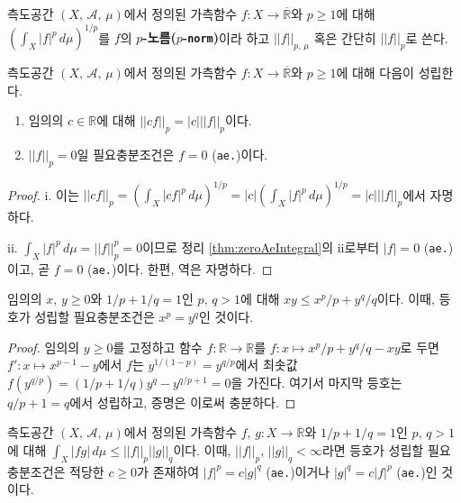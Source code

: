 \begin{definition}
    측도공간 $(X,\,\mathcal{A},\,\mu)$에서 정의된 가측함수 $f:X\to\overline{\mathbb{R}}$와 $p\geq1$에 대해 $(\int_X|f|^p\,d\mu)^{1/p}$를 $f$의 \textbf{$p$-노름($p$-\texttt{norm})}이라 하고 $||f||_{p,\,\mu}$ 혹은 간단히 $||f||_p$로 쓴다.
\end{definition}

\begin{proposition}\label{prop:lpnormScale}
    측도공간 $(X,\,\mathcal{A},\,\mu)$에서 정의된 가측함수 $f:X\to\overline{\mathbb{R}}$와 $p\geq1$에 대해 다음이 성립한다.
    \begin{enumerate}
        \item 임의의 $c\in\mathbb{R}$에 대해 $||cf||_p=|c|||f||_p$이다.
        \item $||f||_p=0$일 필요충분조건은 $f=0$ (\texttt{ae.})이다.
    \end{enumerate}
\end{proposition}

\begin{proof}
    i. 이는 $||cf||_p=(\int_X|cf|^p\,d\mu)^{1/p}=|c|(\int_X|f|^p\,d\mu)^{1/p}=|c|||f||_p$에서 자명하다.

    ii. $\int_X|f|^p\,d\mu=||f||_p^p=0$이므로 정리 \ref{thm:zeroAeIntegral}의 ii로부터  $|f|=0$ (\texttt{ae.})이고, 곧 $f=0$ (\texttt{ae.})이다. 한편, 역은 자명하다.
\end{proof}

\begin{lemma}
    임의의 $x,\,y\geq0$와 $1/p+1/q=1$인 $p,\,q>1$에 대해 $xy\leq x^p/p+y^q/q$이다. 이때, 등호가 성립할 필요충분조건은 $x^p=y^q$인 것이다.
\end{lemma}

\begin{proof}
    임의의 $y\geq0$를 고정하고 함수 $f:\mathbb{R}\to\mathbb{R}$를 $f:x\mapsto x^p/p+y^q/q-xy$로 두면 $f':x\mapsto x^{p-1}-y$에서 $f$는 $y^{1/(1-p)}=y^{q/p}$에서 최솟값 $f(y^{q/p})=(1/p+1/q)y^q-y^{q/p+1}=0$을 가진다. 여기서 마지막 등호는 $q/p+1=q$에서 성립하고, 증명은 이로써 충분하다.
\end{proof}

\begin{theorem}
    측도공간 $(X,\,\mathcal{A},\,\mu)$에서 정의된 가측함수 $f,\,g:X\to\overline{\mathbb{R}}$와 $1/p+1/q=1$인 $p,\,q>1$에 대해 $\int_X|fg|\,d\mu\leq||f||_p||g||_q$이다. 이때, $||f||_p,\,||g||_q<\infty$라면 등호가 성립할 필요충분조건은 적당한 $c\geq0$가 존재하여 $|f|^p=c|g|^q$ (\texttt{ae.})이거나 $|g|^q=c|f|^p$ (\texttt{ae.})인 것이다.
\end{theorem}


